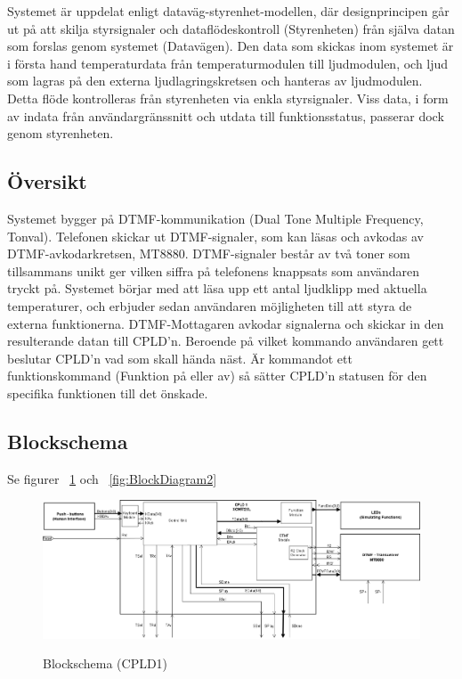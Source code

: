 \documentclass[a4paper,11pt]{article}
\begin{document}
	Systemet är uppdelat enligt dataväg-styrenhet-modellen, där designprincipen går ut på att skilja styrsignaler
	och dataflödeskontroll (Styrenheten) från själva datan som forslas genom systemet (Datavägen). Den data som
	skickas inom systemet är i första hand temperaturdata från temperaturmodulen till ljudmodulen, och ljud som
	lagras på den externa ljudlagringskretsen och hanteras av ljudmodulen. Detta flöde kontrolleras från styrenheten via
	enkla styrsignaler. Viss data, i form av indata från användargränssnitt och utdata till funktionsstatus, passerar
	dock genom styrenheten.

	\subsection{Översikt}

	Systemet bygger på DTMF-kommunikation (Dual Tone Multiple Frequency, Tonval). Telefonen skickar ut DTMF-signaler, som kan
	läsas och avkodas av DTMF-avkodarkretsen, MT8880. DTMF-signaler består av två toner som tillsammans unikt ger vilken
	siffra på telefonens knappsats som användaren tryckt på. Systemet börjar med att läsa upp ett antal ljudklipp med
	aktuella temperaturer, och erbjuder sedan användaren möjligheten till att styra de externa funktionerna.
	DTMF-Mottagaren avkodar signalerna och skickar in den resulterande
	datan till CPLD'n. Beroende på vilket kommando användaren gett beslutar CPLD'n vad som skall hända näst. Är kommandot ett
	funktionskommand (Funktion på eller av) så sätter CPLD'n statusen för den specifika funktionen till det önskade. 

	\subsection{Blockschema}

	Se figurer ~\ref{fig:BlockDiagram1} och ~\ref{fig:BlockDiagram2}

	\begin{figure}[ht!]
	  \centering
	      \includegraphics[scale=0.48, angle=90]{BlockDiagramCPLD1.png}
		\label{fig:BlockDiagram1}
	  	\caption{Blockschema (CPLD1)}
	\end{figure}
\end{document}

